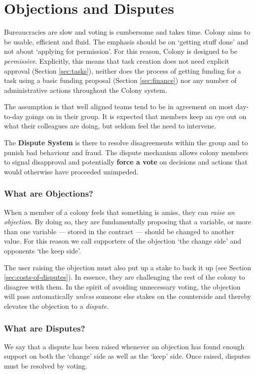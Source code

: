 \section{Objections and Disputes}\label{sec:objections-and-disputes}
Bureaucracies are slow and voting is cumbersome and takes time. Colony aims to be usable, efficient and fluid. The emphasis should be on `getting stuff done' and not about `applying for permission'. For this reason, Colony is designed to be \emph{permissive}. Explicitly, this means that task creation does not need explicit approval (Section \ref{sec:tasks}), neither does the process of getting funding for a task using a basic funding proposal (Section \ref{sec:finance}) nor any number of administrative actions throughout the Colony system.

The assumption is that well aligned teams tend to be in agreement on most day-to-day goings on in their group. It is expected that members keep an eye out on what their colleagues are doing, but seldom feel the need to intervene. 

The \textbf{Dispute System} is there to resolve disagreements within the group and to punish bad behaviour and fraud. The dispute mechanism allows colony members to signal disapproval and potentially \textbf{force a vote} on decisions and actions that would otherwise have proceeded unimpeded.


\subsubsection*{What are Objections?}
When a member of a colony feels that something is amiss, they can \emph{raise an objection}. By doing so, they are fundamentally proposing that a variable, or more than one variable --- stored in the  contract --- should be changed to another value. For this reason we call supporters of the objection `the change side' and opponents `the keep side'.

The user raising the objection must also put up a stake to back it up (see Section \ref{sec:costs-of-disputes}). In essence, they are challenging the rest of the colony to disagree with them. In the spirit of avoiding unnecessary voting, the objection will pass automatically \emph{unless} someone else stakes on the counterside and thereby elevates the objection to a \emph{dispute}.

\subsubsection*{What are Disputes?}
We say that a dispute has been raised whenever an objection has found enough support on both the `change' side as well as the `keep' side. Once raised, disputes must be resolved by voting. 

